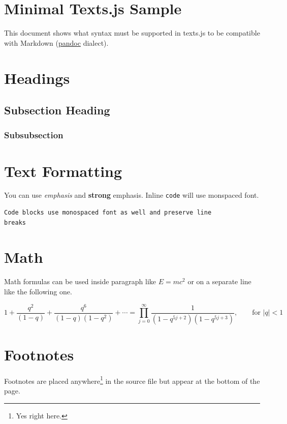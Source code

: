 \documentclass[10pt]{article}
\begin{document}
\section{Minimal Texts.js Sample}

This document shows what syntax must be supported in texts.js to be compatible
with Markdown (\href{http://johnmacfarlane.net/pandoc/}{pandoc} dialect).

\section{Headings}

\subsection{Subsection Heading}

\subsubsection{Subsubsection}

\section{Text Formatting}

You can use \emph{emphasis} and \textbf{strong} emphasis. Inline \texttt{code}
will use monspaced font.

\begin{verbatim}
Code blocks use monospaced font as well and preserve line
breaks
\end{verbatim}

\section{Math}

Math formulas can be used inside paragraph like $E=mc^2$ or on a separate line like the following one.

\begin{equation}
1+\frac{q^2}{(1-q)}+\frac{q^6}{(1-q)(1-q^2)}+\cdots =
\prod_{j=0}^{\infty}\frac{1}{(1-q^{5j+2})(1-q^{5j+3})},
\quad\quad \text{for $|q|<1$}
\end{equation}

\section{Footnotes}

Footnotes are placed anywhere\footnote{Yes right here.} in the source file but
appear at the bottom of the page.
\end{document}
